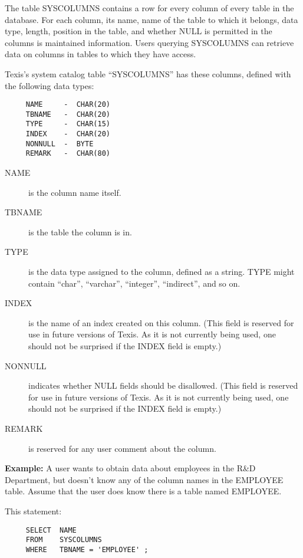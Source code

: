 The table SYSCOLUMNS contains a row for every column of every table
in the database.  For each column, its name, name of the table to
which it belongs, data type, length, position in the table, and
whether NULL is permitted in the columns is maintained information.
Users querying SYSCOLUMNS can retrieve data on columns in tables to
which they have access.

Texis's system catalog table ``SYSCOLUMNS'' has these columns, defined
with the following data types:

\begin{verbatim}
     NAME     -  CHAR(20)
     TBNAME   -  CHAR(20)
     TYPE     -  CHAR(15)
     INDEX    -  CHAR(20)
     NONNULL  -  BYTE
     REMARK   -  CHAR(80)
\end{verbatim}

\begin{description}
\item[NAME] is the column name itself.

\item[TBNAME] is the table the column is in.

\item[TYPE] is the data type assigned to the column, defined as a
string.  TYPE might contain ``char'', ``varchar'', ``integer'',
``indirect'', and so on.

\item[INDEX] is the name of an index created on this column.  (This
field is reserved for use in future versions of Texis.  As it is not
currently being used, one should not be surprised if the INDEX field
is empty.)

\item[NONNULL] indicates whether NULL fields should be disallowed.
(This field is reserved for use in future versions of Texis.  As it is
not currently being used, one should not be surprised if the INDEX
field is empty.)

\item[REMARK] is reserved for any user comment about the column.
\end{description}

{\bf Example:}
A user wants to obtain data about employees in the R\&D Department,
but doesn't know any of the column names in the EMPLOYEE table.
Assume that the user does know there is a table named EMPLOYEE.

This statement:
\begin{verbatim}
     SELECT  NAME
     FROM    SYSCOLUMNS
     WHERE   TBNAME = 'EMPLOYEE' ;
\end{verbatim}

